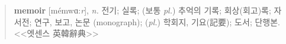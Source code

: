 \documentclass[10pt,letterpaper,extrafontsizes]{memoir}
\newcommand\svnidlong[4]{}
\begin{document}
\vspace{2\baselineskip}

\makeatletter
\def\ATonum{\@onum}
\makeatother

\begin{quote}
\textbf{memoir} [{mémwɑ:\textit{r}}], \textit{n.} \ATonum1 \textsf{전기}; 실록; (보통 \emph{pl.}) 추억의 기록; 회상(회고)록; 자서전; \ATonum2 연구, 보고, 논문 (monograph); (\emph{pl.}) 학회지, 기요(記要); \ATonum3 도서; 단행본.
\\[0.5\baselineskip]
\hspace*{\fill} <<엣센스 英韓辭典>>
\end{quote}

\vspace*{\fill}

\cleardoublepage

\pagestyle{headings}

\setupshorttoc
\tableofcontents
\clearpage
\setupparasubsecs
\setupmaintoc

\begingroup

%




\tableofcontents

\endgroup


\setlength{\unitlength}{1pt}
\clearpage
\listoffigures
\clearpage
\listoftables
\clearpage
\listofegresults




\svnidlong
{$Ignore: $}
{$LastChangedDate: 2014-11-05 16:28:11 +0100 (Wed, 05 Nov 2014) $}
{$LastChangedRevision: 501 $}
{$LastChangedBy: daleif $}


\end{document}

